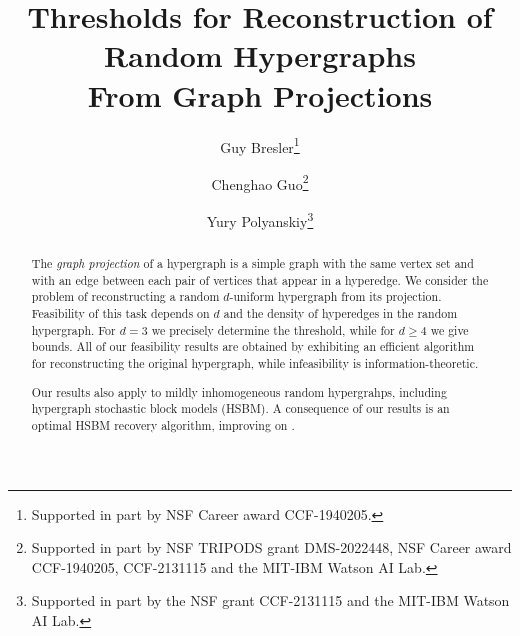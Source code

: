 \documentclass{article}
\title{Thresholds for Reconstruction of Random Hypergraphs \\ From Graph Projections}
\author{Guy Bresler\thanks{Supported in part by NSF Career award CCF-1940205.}
\and Chenghao Guo\thanks{Supported in part by NSF TRIPODS grant DMS-2022448, NSF Career award CCF-1940205, CCF-2131115 and the MIT-IBM Watson AI Lab.} \and Yury Polyanskiy\thanks{Supported in part by the NSF grant CCF-2131115 and the MIT-IBM Watson AI Lab.}}
\date{}
\begin{document}
\maketitle

\begin{abstract}
The \emph{graph projection} of a hypergraph is a simple graph with the same vertex set and with an edge between each pair of vertices that appear in a hyperedge.  
We consider the problem of reconstructing a random $d$-uniform hypergraph from its projection. Feasibility of this task depends on $d$ and the density of hyperedges in the random hypergraph. For $d=3$ we precisely determine the threshold, while for $d\geq 4$ we give bounds. All of our feasibility results are obtained by exhibiting an efficient algorithm for reconstructing the original hypergraph, while infeasibility is information-theoretic. 

Our results also apply to mildly inhomogeneous random hypergrahps, including hypergraph stochastic block models (HSBM). A consequence of our results is an optimal HSBM recovery algorithm, improving on \cite{gaudio2023community}. 
\end{abstract}



% 



% 







% 



\appendix



% 













\end{document}
